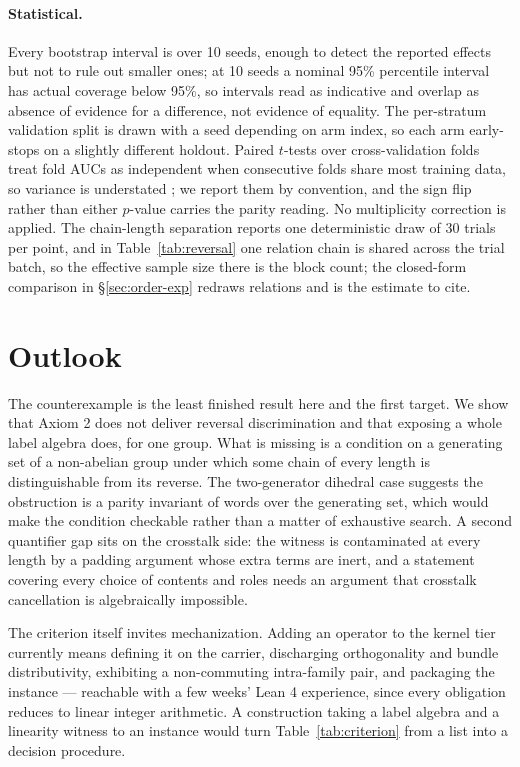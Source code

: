 \documentclass[10pt]{article}
\begin{document}
\paragraph{Statistical.} Every bootstrap interval is over 10 seeds, enough to detect the reported effects but not to rule out smaller ones; at 10 seeds a nominal 95\% percentile interval has actual coverage below 95\%, so intervals read as indicative and overlap as absence of evidence for a difference, not evidence of equality. The per-stratum validation split is drawn with a seed depending on arm index, so each arm early-stops on a slightly different holdout. Paired $t$-tests over cross-validation folds treat fold AUCs as independent when consecutive folds share most training data, so variance is understated \citep{nadeau2003inference}; we report them by convention, and the sign flip rather than either $p$-value carries the parity reading. No multiplicity correction is applied. The chain-length separation reports one deterministic draw of 30 trials per point, and in Table~\ref{tab:reversal} one relation chain is shared across the trial batch, so the effective sample size there is the block count; the closed-form comparison in \S\ref{sec:order-exp} redraws relations and is the estimate to cite.


\section{Outlook}
\label{sec:outlook}

The counterexample is the least finished result here and the first target. We show that Axiom 2 does not deliver reversal discrimination and that exposing a whole label algebra does, for one group. What is missing is a condition on a generating set of a non-abelian group under which some chain of every length is distinguishable from its reverse. The two-generator dihedral case suggests the obstruction is a parity invariant of words over the generating set, which would make the condition checkable rather than a matter of exhaustive search. A second quantifier gap sits on the crosstalk side: the witness is contaminated at every length by a padding argument whose extra terms are inert, and a statement covering every choice of contents and roles needs an argument that crosstalk cancellation is algebraically impossible.

The criterion itself invites mechanization. Adding an operator to the kernel tier currently means defining it on the carrier, discharging orthogonality and bundle distributivity, exhibiting a non-commuting intra-family pair, and packaging the instance --- reachable with a few weeks' Lean 4 experience, since every obligation reduces to linear integer arithmetic. A construction taking a label algebra and a linearity witness to an instance would turn Table~\ref{tab:criterion} from a list into a decision procedure.
\end{document}
